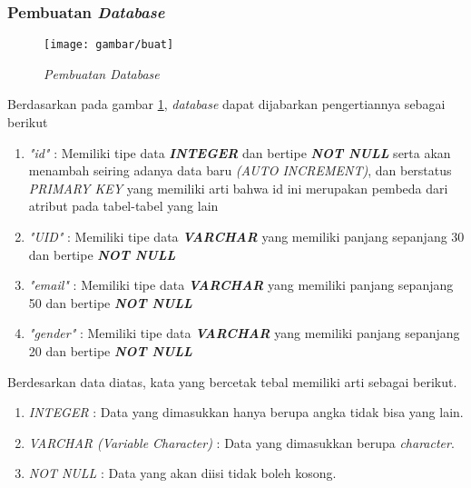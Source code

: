 \subsubsection{Pembuatan \textit{Database}}
\begin{figure}[!htbp]
    \centering
    \texttt{[image: gambar/buat]}
    \caption{\textit{Pembuatan \textit{Database}}}
    \label{pembuatandb}
\end{figure}
\par 
Berdasarkan pada gambar \ref{pembuatandb}, \textit{database} dapat dijabarkan pengertiannya sebagai berikut
\begin{enumerate}
	\item \textit{"id"} : Memiliki tipe data \textit{\textbf{INTEGER}} dan bertipe \textit{\textbf{NOT NULL}}
	serta akan menambah seiring adanya data baru \textit{(AUTO INCREMENT)}, dan berstatus \textit{PRIMARY KEY} yang memiliki arti bahwa id ini merupakan pembeda dari atribut pada tabel-tabel yang lain
	\item \textit{"UID"} : Memiliki tipe data \textit{\textbf{VARCHAR}} yang memiliki panjang sepanjang 30 dan bertipe \textit{\textbf{NOT NULL}}
	\item \textit{"email"} : Memiliki tipe data \textit{\textbf{VARCHAR}} yang memiliki panjang sepanjang 50 dan bertipe \textit{\textbf{NOT NULL}}
	\item \textit{"gender"} : Memiliki tipe data \textit{\textbf{VARCHAR}} yang memiliki panjang sepanjang 20 dan bertipe \textit{\textbf{NOT NULL}}
\end{enumerate}


\par
Berdesarkan data diatas, kata yang bercetak tebal memiliki arti sebagai berikut.
\begin{enumerate}
\item \textit{INTEGER} : Data yang dimasukkan hanya berupa angka tidak bisa yang lain.
\item \textit{VARCHAR (Variable Character)} : Data yang dimasukkan berupa \textit{character}.
\item \textit{NOT NULL} : Data yang akan diisi tidak boleh kosong.
\end{enumerate}